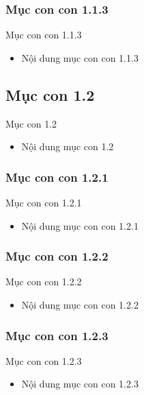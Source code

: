 \documentclass{beamer}
\begin{document}
\subsubsection{Mục con con 1.1.3}
\begin{frame}{Mục con con 1.1.3}
\begin{itemize}
\item Nội dung mục con con 1.1.3
\end{itemize}
\end{frame}

\subsection{Mục con 1.2}
\begin{frame}{Mục con 1.2}
\begin{itemize}
\item Nội dung mục con 1.2
\end{itemize}
\end{frame}

\subsubsection{Mục con con 1.2.1}
\begin{frame}{Mục con con 1.2.1}
\begin{itemize}
\item Nội dung mục con con 1.2.1
\end{itemize}
\end{frame}

\subsubsection{Mục con con 1.2.2}
\begin{frame}{Mục con con 1.2.2}
\begin{itemize}
\item Nội dung mục con con 1.2.2
\end{itemize}
\end{frame}

\subsubsection{Mục con con 1.2.3}
\begin{frame}{Mục con con 1.2.3}
\begin{itemize}
\item Nội dung mục con con 1.2.3
\end{itemize}
\end{frame}
\end{document}
